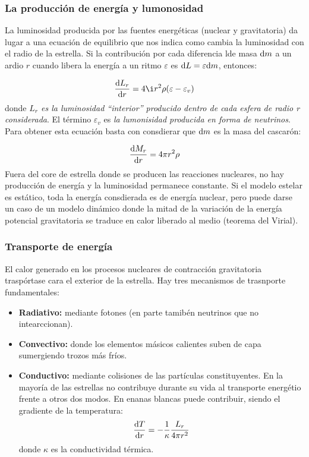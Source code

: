 \subsubsection{La producción de energía y lumonosidad}

La luminosidad producida por las fuentes energéticas (nuclear y gravitatoria) da lugar a una ecuación de equilibrio que nos indica como cambia la luminosidad con el radio de la estrella. Si la contribución por cada diferencia lde masa $\mathrm{d} m$ a un ardio $r$ cuando libera la energía a un ritmo $\varepsilon$ es $\mathrm{d} L = \varepsilon \mathrm{d} m$, entonces:

\begin{equation}
    \derivadas{L_r}{r} = 4 \i r^2 \rho (\varepsilon-\varepsilon_{{v}})
\end{equation}
donde \textit{$L_r$ es la luminosidad ``interior'' producido dentro de cada esfera de radio r considerada}. El término $\varepsilon_v$ es \textit{la lumonisidad producida en forma de neutrinos}. Para obtener esta ecuación basta con consdierar que $\mathrm{d} m$ es la masa del cascarón:

\begin{equation*}
    \frac{\mathrm{d} M_r}{\mathrm{d} r} = 4 \pi r^2 \rho
\end{equation*}
Fuera del core de estrella donde se producen las reacciones nucleares, no hay producción de energía y la luminosidad permanece constante. Si el modelo estelar es estático, toda la energía consdierada es de energía nuclear, pero puede darse un caso de un modelo dinámico donde la mitad de la variación de la energía potencial gravitatoria se traduce en calor liberado al medio (teorema del Virial).

\subsubsection{Transporte de energía}

El calor generado en los procesos nucleares de contracción gravitatoria traspórtase cara el exterior de la estrella. Hay tres mecanismos de trasnporte fundamentales:

\begin{itemize}
    \item \textbf{Radiativo:} mediante fotones (en parte tamibén neutrinos que no intearccionan). 
    \item \textbf{Convectivo:} donde los elementos másicos calientes suben de capa sumergiendo trozos más fríos.
    \item \textbf{Conductivo:} mediante colisiones de las partículas constituyentes. En la mayoría de las estrellas no contribuye durante su vida al transporte energétio frente a otros dos modos. En enanas blancas puede contribuir, siendo el gradiente de la temperatura:
    \begin{equation}
        \frac{\mathrm{d} T}{\mathrm{d} r} = - \frac{1}{\kappa} \frac{L_r}{4\pi r^2}
    \end{equation}
    donde $\kappa$ es la conductividad térmica. 
\end{itemize}

